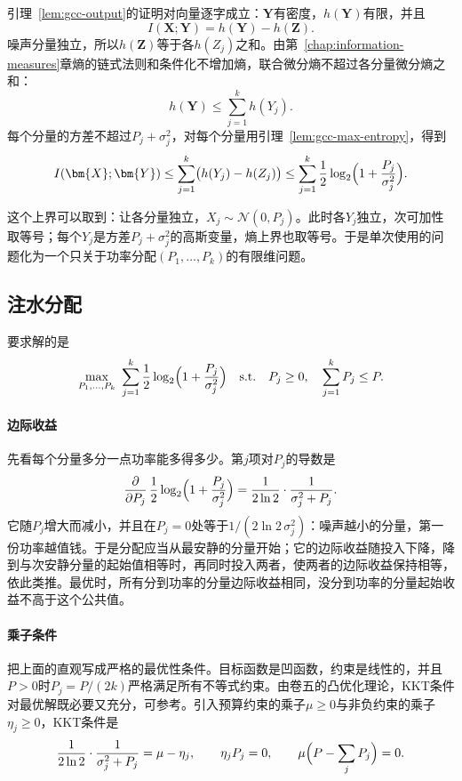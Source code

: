 引理~\ref{lem:gcc-output}的证明对向量逐字成立：$\bm{Y}$有密度，$h(\bm{Y})$有限，并且
\[
 I(\bm{X};\bm{Y})=h(\bm{Y})-h(\bm{Z}) .
\]
噪声分量独立，所以$h(\bm{Z})$等于各$h(Z_j)$之和。由第~\ref{chap:information-measures}章熵的链式法则和条件化不增加熵，联合微分熵不超过各分量微分熵之和：
\[
 h(\bm{Y})\leq\sum_{j=1}^{k}h(Y_j) .
\]
每个分量的方差不超过$P_j+\sigma_j^2$，对每个分量用引理~\ref{lem:gcc-max-entropy}，得到
\begin{equation}
 I(\bm{X};\bm{Y})\leq\sum_{j=1}^{k}\bigl(h(Y_j)-h(Z_j)\bigr)\leq\sum_{j=1}^{k}\frac12\log_2\Bigl(1+\frac{P_j}{\sigma_j^2}\Bigr) .
 \label{eq:gcc-parallel-upper}
\end{equation}

这个上界可以取到：让各分量独立，$X_j\sim\mathcal{N}(0,P_j)$。此时各$Y_j$独立，次可加性取等号；每个$Y_j$是方差$P_j+\sigma_j^2$的高斯变量，熵上界也取等号。于是单次使用的问题化为一个只关于功率分配$(P_1,\dots,P_k)$的有限维问题。

\subsection{注水分配}
\label{sec:gcc-waterfilling}

要求解的是
\begin{equation}
 \max_{P_1,\dots,P_k}\ \sum_{j=1}^{k}\frac12\log_2\Bigl(1+\frac{P_j}{\sigma_j^2}\Bigr)
 \quad\text{s.t.}\quad P_j\geq0,\quad\sum_{j=1}^{k}P_j\leq P .
 \label{eq:gcc-allocation}
\end{equation}

\paragraph{边际收益}
先看每个分量多分一点功率能多得多少。第$j$项对$P_j$的导数是
\[
 \frac{\partial}{\partial P_j}\,\frac12\log_2\Bigl(1+\frac{P_j}{\sigma_j^2}\Bigr)=\frac{1}{2\ln2}\cdot\frac{1}{\sigma_j^2+P_j} .
\]
它随$P_j$增大而减小，并且在$P_j=0$处等于$1/(2\ln2\,\sigma_j^2)$：噪声越小的分量，第一份功率越值钱。于是分配应当从最安静的分量开始；它的边际收益随投入下降，降到与次安静分量的起始值相等时，再同时投入两者，使两者的边际收益保持相等，依此类推。最优时，所有分到功率的分量边际收益相同，没分到功率的分量起始收益不高于这个公共值。

\paragraph{乘子条件}
把上面的直观写成严格的最优性条件。目标函数是凹函数，约束是线性的，并且$P>0$时$P_j=P/(2k)$严格满足所有不等式约束。由卷五的凸优化理论，KKT条件对最优解既必要又充分，可参考。引入预算约束的乘子$\mu\geq0$与非负约束的乘子$\eta_j\geq0$，KKT条件是
\[
 \frac{1}{2\ln2}\cdot\frac{1}{\sigma_j^2+P_j}=\mu-\eta_j,\qquad \eta_jP_j=0,\qquad \mu\Bigl(P-\sum_{j}P_j\Bigr)=0 .
\]

